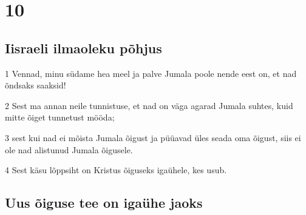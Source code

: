 \chapter{10}

\section*{Iisraeli ilmaoleku põhjus}

\par 1 Vennad, minu südame hea meel ja palve Jumala poole nende eest on, et nad õndsaks saaksid!
\par 2 Sest ma annan neile tunnistuse, et nad on väga agarad Jumala suhtes, kuid mitte õiget tunnetust mööda;
\par 3 sest kui nad ei mõista Jumala õigust ja püüavad üles seada oma õigust, siis ei ole nad alistunud Jumala õigusele.
\par 4 Sest käsu lõppsiht on Kristus õiguseks igaühele, kes usub.

\section*{Uus õiguse tee on igaühe jaoks}

